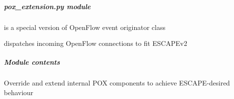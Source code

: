 \documentclass[letterpaper,10pt,english]{sphinxmanual}
\begin{document}
\begin{fulllineitems}

\begin{fulllineitems}
\label{util/nffg:escape.util.nffg.NFFG._abc_negative_cache}
\end{fulllineitems}


\begin{fulllineitems}
\label{util/nffg:escape.util.nffg.NFFG._abc_negative_cache_version}
\end{fulllineitems}


\begin{fulllineitems}
\label{util/nffg:escape.util.nffg.NFFG._abc_registry}
\end{fulllineitems}


\end{fulllineitems}


\begin{fulllineitems}
\label{util/nffg:escape.util.nffg.main}
\end{fulllineitems}



\subparagraph{\emph{pox\_extension.py} module}
\label{util/pox_extension:pox-extension-py-module}\label{util/pox_extension::doc}
{\hyperref[util/pox_extension:escape.util.pox_extension.OpenFlowBridge]{\emph{}}} is a special version of OpenFlow event originator class

{\hyperref[util/pox_extension:escape.util.pox_extension.ExtendedOFConnectionArbiter]{\emph{}}} dispatches incoming OpenFlow connections to
fit ESCAPEv2


\subparagraph{Module contents}
\label{util/pox_extension:module-contents}\label{util/pox_extension:module-escape.util.pox_extension}
Override and extend internal POX components to achieve ESCAPE-desired behaviour
\end{document}

